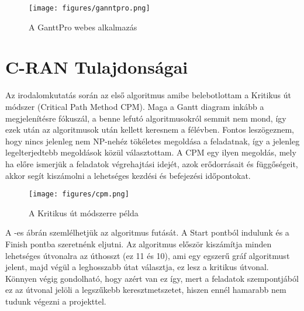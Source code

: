 \begin{figure}[!ht]
\centering
\texttt{[image: figures/ganntpro.png]}
\caption{A GanttPro webes alkalmazás} 
\label{fig:GanttPro}
\end{figure} 

\section{C-RAN Tulajdonságai}
\hspace{2mm} \indent Az irodalomkutatás során az első algoritmus amibe belebotlottam a Kritikus út módszer (Critical Path Method CPM). Maga a Gantt diagram inkább a megjelenítésre fókuszál, a benne lefutó algoritmusokról semmit nem mond, így ezek után az algoritmusok után kellett keresnem a félévben.  Fontos leszögeznem, hogy nincs jelenleg nem NP-nehéz tökéletes megoldása a feladatnak, így a jelenleg legelterjedtebb megoldások közül választottam. A CPM egy ilyen megoldás, mely ha előre ismerjük a feladatok végrehajtási idejét, azok erődorrásait és függőségeit, akkor segít kiszámolni a lehetséges kezdési és befejezési időpontokat. \cite{CPM}

\begin{figure}[!ht]
\centering
\texttt{[image: figures/cpm.png]}
\caption{A Kritikus út módszerre példa} 
\label{fig:CPM}
\end{figure} 

A -es ábrán szemlélhetjük az algoritmus futását. A Start pontból indulunk és a Finish pontba szeretnénk eljutni. Az algoritmus először kiszámítja minden lehetséges útvonalra az úthosszt (ez 11 és 10), ami egy egszerű gráf algoritmust jelent, majd végül a leghosszabb útat választja, ez lesz a kritikus útvonal. Könnyen végig gondolható, hogy azért van ez így, mert a feladatok szempontjából ez az útvonal jelöli a legszűkebb keresztmetszetet, hiszen ennél hamarabb nem tudunk végezni a projekttel.

